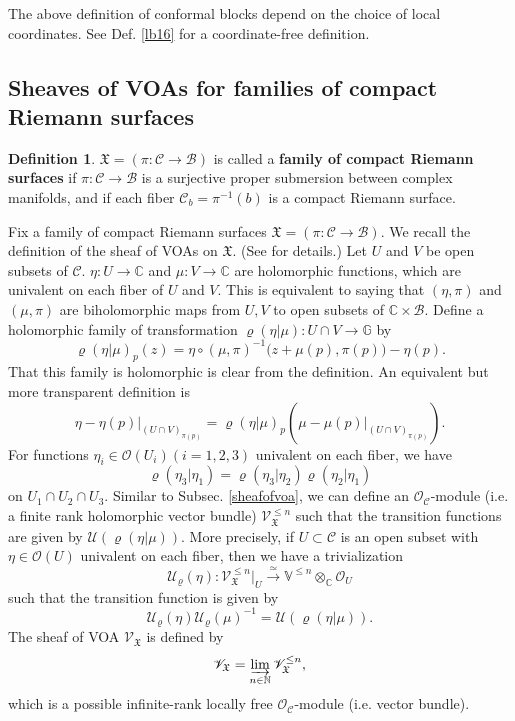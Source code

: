 \documentclass[11pt,b5paper,notitlepage]{article}
\theoremstyle{definition}
\newtheorem{df}{Definition}[section]
\theoremstyle{plain}
\newcommand{\mc}{\mathcal}
\newcommand{\SV}{\mathscr{V}}
\newcommand{\Vbb}{\mathbb V}
\newcommand{\Gbb}{\mathbb G}
\newcommand{\Cbb}{\mathbb C}
\newcommand{\Nbb}{\mathbb N}
\newcommand{\<}{\left\langle}
\renewcommand{\>}{\right\rangle}
\newcommand{\MO}{\mathcal{O}}
\newcommand{\MU}{\mathcal{U}}
\newcommand{\MC}{\mathcal{C}}
\newcommand{\MB}{\mathcal{B}}
\newcommand{\fx}{\mathfrak{X}}
\numberwithin{equation}{section}
\begin{document}
The above definition of conformal blocks depend on the choice of local coordinates. See Def. \ref{lb16} for a coordinate-free definition.









\subsection{Sheaves of VOAs for families of compact Riemann surfaces}
\begin{df}
    $\fx=(\pi:\MC\rightarrow \MB)$ is called a \textbf{family of compact Riemann surfaces} if $\pi:\MC\rightarrow \MB$ is a surjective proper submersion between complex manifolds, and if each fiber $\MC_b=\pi^{-1}(b)$ is a compact Riemann surface.
\end{df}


Fix a family of compact Riemann surfaces $\fx=(\pi:\MC\rightarrow \MB)$. We recall the definition of the sheaf of VOAs on $\fx$. (See \cite[Sec. 5]{Gui-sewingconvergence} for details.) Let $U$ and $V$ be open subsets of $\MC$. $\eta:U\rightarrow \Cbb$ and $\mu:V\rightarrow \Cbb$ are holomorphic functions, which are univalent on each fiber of $U$ and $V$. This is equivalent to saying that $(\eta,\pi)$ and $(\mu,\pi)$ are biholomorphic maps from $U,V$ to open subsets of $\Cbb\times \MB$. Define a holomorphic family of transformation $\varrho(\eta\vert \mu):U\cap V\rightarrow \Gbb$ by 
$$
\varrho(\eta\vert \mu)_p(z)=\eta\circ (\mu,\pi)^{-1}\big(z+\mu(p),\pi(p)\big)-\eta(p).
$$
That this family is holomorphic is clear from the definition. An equivalent but more transparent definition is
$$
\eta-\eta(p)\vert_{(U\cap V)_{\pi(p)}}=\varrho(\eta\vert \mu)_p(\mu-\mu(p)\vert_{(U\cap V)_{\pi(p)}}).
$$
For functions $\eta_i\in \MO(U_i)(i=1,2,3)$ univalent on each fiber, we have
$$
\varrho(\eta_3\vert \eta_1)=\varrho(\eta_3\vert \eta_2)\varrho(\eta_2\vert \eta_1)
$$
on $U_1\cap U_2\cap U_3$. Similar to Subsec. \ref{sheafofvoa}, we can define an $\mc O_{\mc C}$-module  (i.e. a finite rank holomorphic vector bundle) $\SV_{\fx}^{\leq n}$ such that the transition functions are given by $\MU(\varrho(\eta\vert \mu))$. More precisely, if $U\subset \MC$ is an open subset with $\eta\in \MO(U)$ univalent on each fiber, then we have a trivialization
$$
\MU_\varrho(\eta):\SV_\fx^{\leq n}\vert_{U}\xrightarrow{\simeq }\Vbb^{\leq n}\otimes_{\Cbb} \MO_U
$$
such that the transition function is given by
$$
\MU_\varrho(\eta)\MU_\varrho(\mu)^{-1}=\MU(\varrho(\eta\vert \mu)).
$$
The sheaf of VOA $\SV_\fx$ is defined by 
$$
\SV_\fx=\varinjlim_{n\in \Nbb} \SV_\fx^{\leq n},
$$
which is a possible infinite-rank locally free $\mc O_{\mc C}$-module (i.e. vector bundle).
\end{document}
